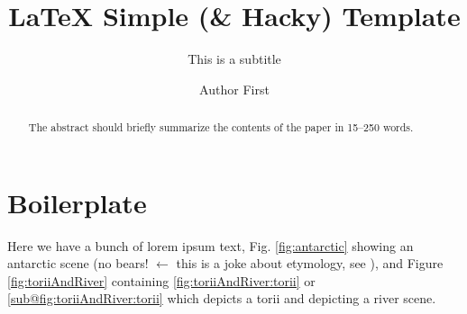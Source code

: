 \documentclass[runningheads, a4paper]{llncs}
\begin{document}
    \title{\LaTeX \hspace{0.09em} Simple (\& Hacky) Template} %
    \subtitle{This is a subtitle}
    
    \author{
        Author First  %
    }
    \maketitle              %
    \begin{abstract}
        The abstract should briefly summarize the contents of the paper in
        15--250 words.

    \end{abstract}

    \tableofcontents
    \listoffigures
    \listoftables

    \newpage
    
    \section{Boilerplate}

        Here we have a bunch of lorem ipsum text, Fig. \ref{fig:antarctic} showing an antarctic scene (no bears! $\leftarrow$ this is a joke about etymology, see \textcite{antarcticEtymonline,articEtymonline}), and Figure \ref{fig:toriiAndRiver} containing \ref{fig:toriiAndRiver:torii} or \ref{sub@fig:toriiAndRiver:torii} which depicts a torii and  depicting a river scene.
\end{document}
